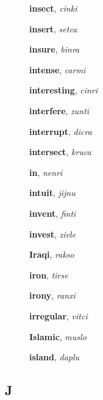 \documentclass[12pt]{book}
\begin{document}
\begin{description}
\item[ ] \textbf{insect}, \textit{cinki}

\item[ ] \textbf{insert}, \textit{setca}

\item[ ] \textbf{insure}, \textit{binra}

\item[ ] \textbf{intense}, \textit{carmi}

\item[ ] \textbf{interesting}, \textit{cinri}

\item[ ] \textbf{interfere}, \textit{zunti}

\item[ ] \textbf{interrupt}, \textit{dicra}

\item[ ] \textbf{intersect}, \textit{kruca}

\item[ ] \textbf{in}, \textit{nenri}

\item[ ] \textbf{intuit}, \textit{jijnu}

\item[ ] \textbf{invent}, \textit{finti}

\item[ ] \textbf{invest}, \textit{zivle}

\item[ ] \textbf{Iraqi}, \textit{rakso}

\item[ ] \textbf{iron}, \textit{tirse}

\item[ ] \textbf{irony}, \textit{ranxi}

\item[ ] \textbf{irregular}, \textit{vitci}

\item[ ] \textbf{Islamic}, \textit{muslo}

\item[ ] \textbf{island}, \textit{daplu}



\end{description}



\subsection{J} %
\end{document}
